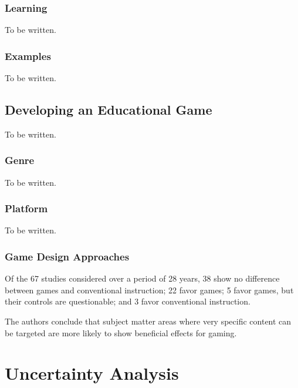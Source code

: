 \documentclass[a4paper,11.5pt]{report}
\numberwithin{figure}{section}
\numberwithin{table}{section}
\numberwithin{equation}{section}
\numberwithin{equation}{section}
\newcommand\blankpage{%
    \null
    \thispagestyle{empty}%
    \addtocounter{page}{-1}%
    \newpage}
\begin{document}
\subsection{Learning}

To be written.

\subsection{Examples}

To be written.

\section{Developing an Educational Game}

To be written.

\subsection{Genre}

To be written.

\subsection{Platform}

To be written.

\subsection{Game Design Approaches}

Of the 67 studies considered over a period of 28 years, 38 show no difference between games and conventional instruction; 22 favor games; 5 favor games, but their controls are questionable; and 3 favor conventional instruction. 

The authors conclude that subject matter areas where very specific content can be targeted are more likely to show beneficial effects for gaming.

\afterpage{\blankpage}






\appendix
{}
\appendixpage

\renewcommand\chaptername{Appendix}

\newpage
\chapter{Uncertainty Analysis} \label{app:errors}
\end{document}
